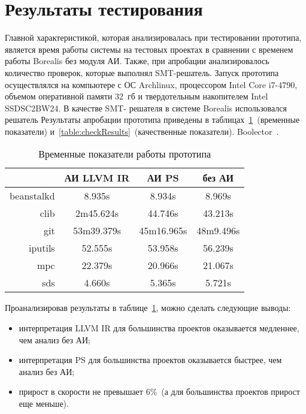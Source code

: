 \section{Результаты тестирования}
Главной характеристикой, которая анализировалась при тестировании прототипа, 
является время работы системы на тестовых проектах в сравнении с временем
работы Borealis без модуля АИ. Также, при апробации анализировалось количество 
проверок, которые выполнял SMT-решатель. Запуск прототипа осуществлялся на 
компьютере с ОС Archlinux, процессором Intel Core i7-4790, объемом оперативной 
памяти 32~гб и твердотельным накопителем Intel SSDSC2BW24. В качестве SMT-
решателя в системе Borealis использовался решатель Результаты апробации 
прототипа приведены в таблицах~\ref{table:timeResults}~(временные показатели) 
и~\ref{table:checkResults}~(качественные показатели). 
Boolector~\cite{boolector}.
\begin{table}
\caption{Временные показатели работы прототипа}
\centering
\begin{tabular}{|r|c|c|c|}
\hline
           & АИ LLVM IR   & АИ PS        & без АИ    \\ \hline
beanstalkd & 8.935s       & 8.934s       & 8.969s    \\ \hline
clib       & 2m45.624s    & 44.746s      & 43.213s   \\ \hline
git        & 53m39.379s   & 45m16.965s   & 48m9.496s \\ \hline
iputils    & 52.555s      & 53.958s      & 56.239s   \\ \hline
mpc        & 22.379s      & 20.966s      & 21.067s   \\ \hline
sds        & 4.660s       & 5.365s       & 5.721s    \\ \hline
\end{tabular}
\label{table:timeResults}
\end{table}

Проанализировав результаты в таблице~\ref{table:timeResults}, можно сделать 
следующие выводы:
\begin{itemize}
\item интерпретация LLVM IR для большинства проектов оказывается медленнее, чем
анализ без АИ;
\item интерпретация PS для большинства проектов оказывается быстрее, чем анализ
без АИ;
\item прирост в скорости не превышает $6\%$~(а для большинства проектов прирост
еще меньше).
\end{itemize}

